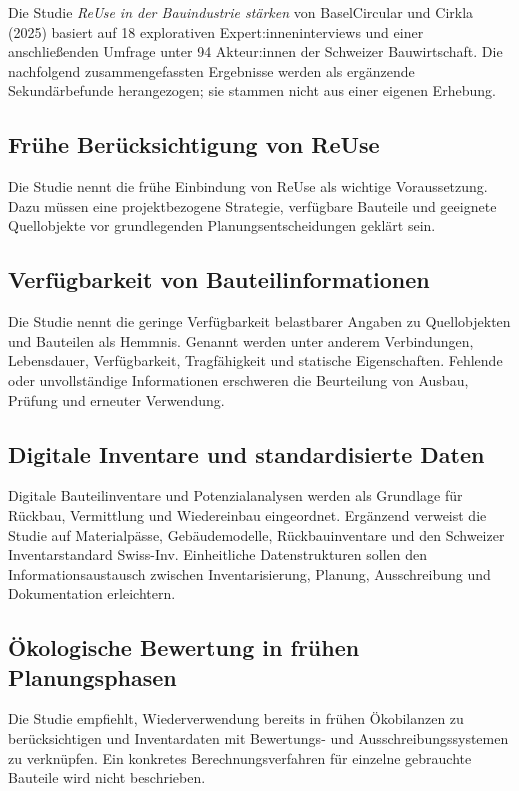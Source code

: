 \label{anlage:sekundaerbefunde}

Die Studie \textit{ReUse in der Bauindustrie stärken} von BaselCircular und Cirkla (2025) \cite{baselcircular-reuse-2025} basiert auf 18 explorativen Expert:inneninterviews und einer anschließenden Umfrage unter 94 Akteur:innen der Schweizer Bauwirtschaft. Die nachfolgend zusammengefassten Ergebnisse werden als ergänzende Sekundärbefunde herangezogen; sie stammen nicht aus einer eigenen Erhebung.


\subsection{Frühe Berücksichtigung von ReUse}

Die Studie nennt die frühe Einbindung von ReUse als wichtige Voraussetzung. Dazu müssen eine projektbezogene Strategie, verfügbare Bauteile und geeignete Quellobjekte vor grundlegenden Planungsentscheidungen geklärt sein.

\subsection{Verfügbarkeit von Bauteilinformationen}

Die Studie nennt die geringe Verfügbarkeit belastbarer Angaben zu Quellobjekten und Bauteilen als Hemmnis. Genannt werden unter anderem Verbindungen, Lebensdauer, Verfügbarkeit, Tragfähigkeit und statische Eigenschaften. Fehlende oder unvollständige Informationen erschweren die Beurteilung von Ausbau, Prüfung und erneuter Verwendung.

\subsection{Digitale Inventare und standardisierte Daten}

Digitale Bauteilinventare und Potenzialanalysen werden als Grundlage für Rückbau, Vermittlung und Wiedereinbau eingeordnet. Ergänzend verweist die Studie auf Materialpässe, Gebäudemodelle, Rückbauinventare und den Schweizer Inventarstandard Swiss-Inv. Einheitliche Datenstrukturen sollen den Informationsaustausch zwischen Inventarisierung, Planung, Ausschreibung und Dokumentation erleichtern.

\subsection{Ökologische Bewertung in frühen Planungsphasen}

Die Studie empfiehlt, Wiederverwendung bereits in frühen Ökobilanzen zu berücksichtigen und Inventardaten mit Bewertungs- und Ausschreibungssystemen zu verknüpfen. Ein konkretes Berechnungsverfahren für einzelne gebrauchte Bauteile wird nicht beschrieben.
